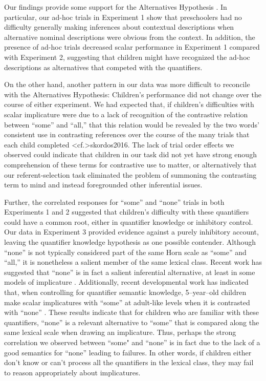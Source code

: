 \documentclass[man]{apa2}
\begin{document}
{Our findings provide some support for the Alternatives Hypothesis . In particular, our ad-hoc trials in Experiment 1 show that preschoolers had no difficulty generally making inferences about contextual descriptions when alternative nominal descriptions were obvious from the context. In addition, the presence of ad-hoc trials decreased scalar performance in Experiment 1 compared with Experiment 2, suggesting that children might have recognized the ad-hoc descriptions as alternatives that competed with the quantifiers.


On the other hand, another pattern in our data was more difficult to reconcile with the Alternatives Hypothesis: Children's performance did not change over the course of either experiment. We had expected that, if children's difficulties with scalar implicature were due to a lack of recognition of the contrastive relation between ``some'' and ``all,'' that this relation would be revealed by the two words' consistent use in contrasting references over the course of the many trials that each child completed  \citeA<cf.>{skordos2016}. The lack of trial order effects we observed could indicate that children in our task did not yet have strong enough comprehension of these terms for contrastive use to matter, or alternatively that our referent-selection task eliminated the problem of summoning the contrasting term to mind and instead foregrounded other inferential issues.

Further, the correlated responses for ``some'' and ``none'' trials in both Experiments 1 and 2 suggested that children's difficulty with these quantifiers could have a common root, either in quantifier knowledge or inhibitory control. Our data in Experiment 3 provided evidence against a purely inhibitory account, leaving the quantifier knowledge hypothesis as one possible contender. Although ``none'' is not typically considered part of the same Horn scale as ``some'' and ``all,'' it is nonetheless a salient member of the same lexical class. Recent work has suggested that ``none'' is in fact a salient inferential alternative, at least in some models of implicature . Additionally, recent developmental work has indicated that, when controlling for quantifier semantic knowledge, 5--year--old children make scalar implicatures with ``some''  at adult-like levels when it is contrasted with ``none'' \cite{skordos2014, skordos2016}. These results indicate that for children who are familiar with these quantifiers,  ``none'' is a relevant alternative to ``some'' that is compared along the same lexical scale when drawing an implicature. Thus, perhaps the strong correlation we observed between ``some" and ``none'' is in fact due to the lack of a good semantics for ``none'' leading to failures. In other words, if children either don't know or can't process all the quantifiers in the lexical class, they may fail to reason appropriately about implicatures.

}
\end{document}
